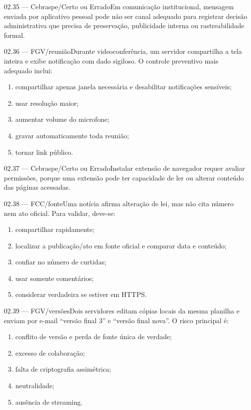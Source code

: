 \begin{questao}{ 02.35 — Cebraspe/Certo ou Errado}Em comunicação institucional, mensagem enviada por aplicativo pessoal pode não ser canal adequado para registrar decisão administrativa que precisa de preservação, publicidade interna ou rastreabilidade formal.\end{questao}
\begin{questao}{ 02.36 — FGV/reunião}Durante videoconferência, um servidor compartilha a tela inteira e exibe notificação com dado sigiloso. O controle preventivo mais adequado inclui:\begin{enumerate}[label=\Alph*)]\item compartilhar apenas janela necessária e desabilitar notificações sensíveis;\item usar resolução maior;\item aumentar volume do microfone;\item gravar automaticamente toda reunião;\item tornar link público.\end{enumerate}\end{questao}
\begin{questao}{ 02.37 — Cebraspe/Certo ou Errado}Instalar extensão de navegador requer avaliar permissões, porque uma extensão pode ter capacidade de ler ou alterar conteúdo das páginas acessadas.\end{questao}
\begin{questao}{ 02.38 — FCC/fonte}Uma notícia afirma alteração de lei, mas não cita número nem ato oficial. Para validar, deve-se:\begin{enumerate}[label=\Alph*)]\item compartilhar rapidamente;\item localizar a publicação/ato em fonte oficial e comparar data e conteúdo;\item confiar no número de curtidas;\item usar somente comentários;\item considerar verdadeira se estiver em HTTPS.\end{enumerate}\end{questao}
\begin{questao}{ 02.39 — FGV/versões}Dois servidores editam cópias locais da mesma planilha e enviam por e-mail ``versão final 3'' e ``versão final nova''. O risco principal é:\begin{enumerate}[label=\Alph*)]\item conflito de versão e perda de fonte única de verdade;\item excesso de colaboração;\item falta de criptografia assimétrica;\item neutralidade;\item ausência de streaming.\end{enumerate}\end{questao}
